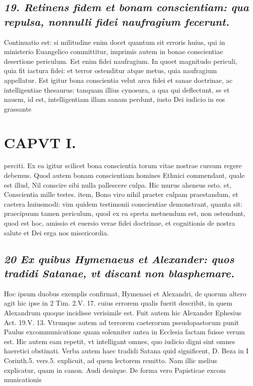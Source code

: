 \documentclass{article}
\begin{document}
\begin{pages}
\subsection*{\textit{19. Retinens fidem et bonam conscientiam: qua repulsa, nonnulli fidei naufragium fecerunt. }}\pstart Continuatio est: si militudine enim docet quantum sit erroris huius, qui in ministerio Euangelico committitur, imprimis autem in bonae conscientiae desertione periculum. Est enim fidei naufragium. In quoet magnitudo periculi, quia fit iactura fidei: et terror ostenditur atque metus, quia naufragium appellatur. Est igitur bona conscientia velut arca fidei et sanae doctrinae, ac intelligentiae thesaurus: tanquam illius cynosura, a qua qui deflectunt, se et nauem, id est, intelligentiam illam sanam perdunt, iusto Dei iudicio in eos grassante  \pend
\section*{CAPVT I. }
\marginpar{[ p.37 ]}\pstart perciti. Ex ea igitur scilicet bona conscientia torum vitae nostrae cursum regere debemus. Quod autem bonam conscientiam homines Ethnici commendant, quale est illud, Nil conscire sibi nulla pallescere culpa. Hic murus aheneus esto. et, Conscientia mille testes. item, Bono viro nihil praeter culpam praestandum, et caetera huiusmodi: vim quidem testimonii conscientiae demonstrant, quanta sit: praecipuum tamen periculum, quod ex ea spreta metuendum est, non ostendunt, quod est hoc, amissio et euersio verae fidei doctrinae, et cognitionis de nostra salute et Dei erga nos misericordia.  \pend
{}
{}
\subsection*{\textit{20 Ex quibus Hymenaeus et Alexander: quos tradidi Satanae, vt discant non blasphemare. }}\pstart Hoc ipsum duobus exemplis confirmat, Hymenaei et Alexandri, de quorum altero agit hic ipse in 2 Tim. 2.V. 17. cuius errorem qualis fuerit describit, in quem Alexandrum quoque  incidisse verisimile est. Fuit autem hic Alexander Ephesius Act. 19.V. 13. Vtrunque autem ad terrorem caeterorum pseudopastorum punit Paulus excommunicatione quam solenniter antea in Ecclesia factam fuisse verum est. Hic autem eam repetit, vt intelligant omnes, quo iudicio digni sint omnes haeretici obstinati. Verba autem haec tradidi Satana quid significent, D. Beza in I Corinth.5. vers.5. explicuit, ad quem lectorem remitto. Nam illic melius explicatur, quam in canon. Audi denique. De forma vero Papisticae excom municationis  \pend

\end{pages}
\end{document}
